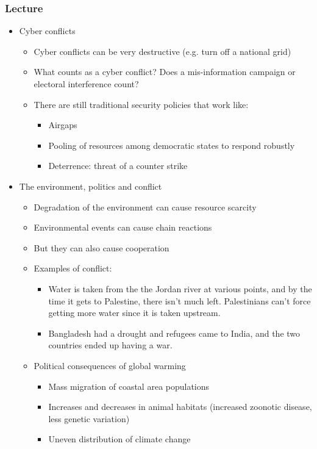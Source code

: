 \documentclass[11pt]{article}
\begin{document}
\subsubsection{Lecture}
\label{sec:orgd540df5}
\begin{itemize}
\item Cyber conflicts
\begin{itemize}
\item Cyber conflicts can be very destructive (e.g. turn off a national grid)
\item What counts as a cyber conflict? Does a mis-information campaign or
electoral interference count?
\item There are still traditional security policies that work like:
\begin{itemize}
\item Airgaps
\item Pooling of resources among democratic states to respond robustly
\item Deterrence: threat of a counter strike
\end{itemize}
\end{itemize}
\item The environment, politics and conflict
\begin{itemize}
\item Degradation of the environment can cause resource scarcity
\item Environmental events can cause chain reactions
\item But they can also cause cooperation
\item Examples of conflict:
\begin{itemize}
\item Water is taken from the the Jordan river at various points, and by the
time it gets to Palestine, there isn't much left. Palestinians can't
force getting more water since it is taken upstream.
\item Bangladesh had a drought and refugees came to India, and the two countries
ended up having a war.
\end{itemize}
\item Political consequences of global warming
\begin{itemize}
\item Mass migration of coastal area populations
\item Increases and decreases in animal habitats (increased zoonotic disease,
less genetic variation)
\item Uneven distribution of climate change

\end{itemize}
\end{itemize}
\end{itemize}
\end{document}
